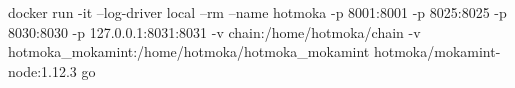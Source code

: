 \begin{shellcommandbox}\begin{ttlst}
docker run -it --log-driver local --rm --name hotmoka -p 8001:8001 -p 8025:8025 -p 8030:8030 -p 127.0.0.1:8031:8031 -v chain:/home/hotmoka/chain -v hotmoka_mokamint:/home/hotmoka/hotmoka_mokamint hotmoka/mokamint-node:1.12.3 go
\end{ttlst}\end{shellcommandbox}
